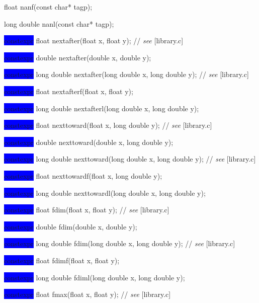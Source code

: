 \documentclass[prd,twocolumn,amsmath,amssymb,nofootinbib,eqsecnum]{revtex4-1}
\newcommand{\oldhighlight}[1]{\colorbox{blue}{\!\!\!\! #1}}
\newcommand{\stdcomment}[1]{{// {\it see} [#1]}}
\begin{document}
{float nanf(const char* tagp);

long double nanl(const char* tagp);

\vspace{2ex}


\oldhighlight{constexpr}  float nextafter(float x, float y); \stdcomment{library.c}

\oldhighlight{constexpr}  double nextafter(double x, double y);

\oldhighlight{constexpr}  long double nextafter(long double x, long double y); \stdcomment{library.c}

\oldhighlight{constexpr}  float nextafterf(float x, float y);

\oldhighlight{constexpr}  long double nextafterl(long double x, long double y);

\vspace{2ex}


\oldhighlight{constexpr}  float nexttoward(float x, long double y); \stdcomment{library.c}

\oldhighlight{constexpr}  double nexttoward(double x, long double y);

\oldhighlight{constexpr}  long double nexttoward(long double x, long double y); \stdcomment{library.c}

\oldhighlight{constexpr}  float nexttowardf(float x, long double y);

\oldhighlight{constexpr}  long double nexttowardl(long double x, long double y);

\vspace{2ex}


\oldhighlight{constexpr}  float fdim(float x, float y); \stdcomment{library.c}

\oldhighlight{constexpr}  double fdim(double x, double y);

\oldhighlight{constexpr}  long double fdim(long double x, long double y); \stdcomment{library.c}

\oldhighlight{constexpr}  float fdimf(float x, float y);

\oldhighlight{constexpr}  long double fdiml(long double x, long double y);

\vspace{2ex}


\oldhighlight{constexpr}  float fmax(float x, float y); \stdcomment{library.c}

}
\end{document}
